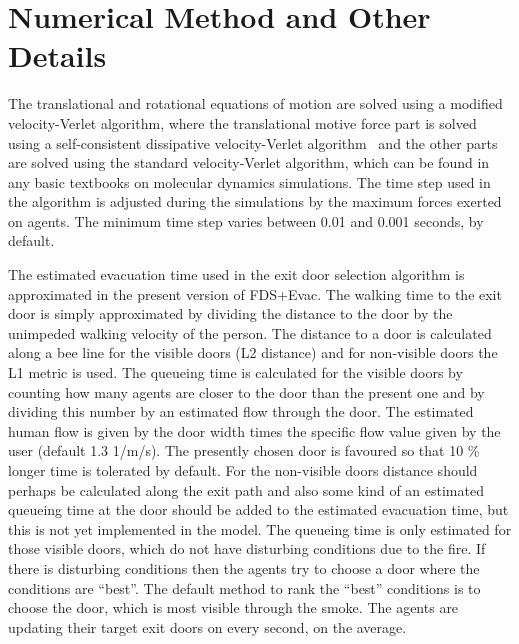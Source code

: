 \documentclass[12pt,a4paper,final,twoside]{stylevk}
\begin{document}


\section{Numerical Method and Other Details}\label{Sec_NumMethod}

\noindent The translational and rotational equations of motion are
solved using a modified velocity-Verlet algorithm, where the
translational motive force part is solved using a self-consistent
dissipative velocity-Verlet algorithm~\cite{Vattulainen02} and the
other parts are solved using the standard velocity-Verlet algorithm,
which can be found in any basic textbooks on molecular dynamics
simulations.  The time step used in the algorithm is adjusted during
the simulations by the maximum forces exerted on agents.  The minimum
time step varies between 0.01 and 0.001 seconds, by default.


The estimated evacuation time used in the exit door selection
algorithm is approximated in the present version of FDS+Evac.  The
walking time to the exit door is simply approximated by dividing the
distance to the door by the unimpeded walking velocity of the person.
The distance to a door is calculated along a bee line for the visible
doors (L2 distance) and for non-visible doors the L1 metric is used.
The queueing time is calculated for the visible doors by counting how
many agents are closer to the door than the present one and by
dividing this number by an estimated flow through the door.  The
estimated human flow is given by the door width times the specific
flow value given by the user (default 1.3 1/m/s).  The presently
chosen door is favoured so that 10 \% longer time is tolerated by
default.  For the non-visible doors distance should perhaps be
calculated along the exit path and also some kind of an estimated
queueing time at the door should be added to the estimated evacuation
time, but this is not yet implemented in the model.  The queueing time
is only estimated for those visible doors, which do not have
disturbing conditions due to the fire.  If there is disturbing
conditions then the agents try to choose a door where the conditions
are ``best''.  The default method to rank the ``best'' conditions is
to choose the door, which is most visible through the smoke.  The
agents are updating their target exit doors on every second, on the
average.
\end{document}
